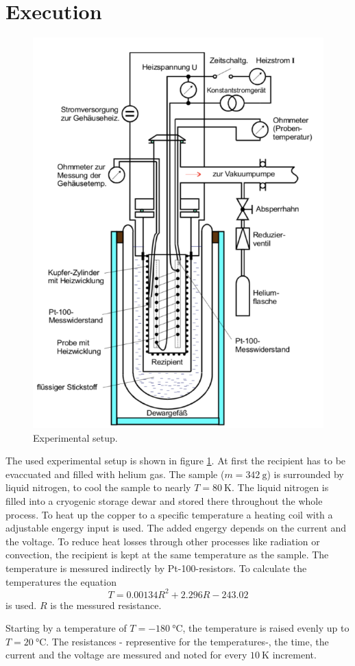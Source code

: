 \section{Execution}
\label{sec:Durchführung}

\begin{figure}
    \centering 
    \includegraphics[width=.8\textwidth]{bilder/Aufbau.PNG}
    \caption{Experimental setup. \cite{V47}}
    \label{fig:Aufbau}
\end{figure}


The used experimental setup is shown in figure \ref{fig:Aufbau}.
At first the recipient has to be evaccuated and filled with helium gas.
The sample ($m=\SI{342}{\g}$) is surrounded by liquid nitrogen, 
to cool the sample to nearly $T=\SI{80}{\kelvin}$. 
The liquid nitrogen is filled into a cryogenic storage dewar 
and stored there throughout the whole process.
To heat up the copper to a specific temperature
a heating coil with a adjustable engergy input is used.
The added engergy depends on the current and the voltage.
To reduce heat losses through other processes like radiation or convection, 
the recipient is kept at the same temperature as the sample.
The temperature is messured indirectly by Pt-100-resistors.
To calculate the temperatures the equation
\begin{equation}
    \label{eq:T}
    T = 0.00134 R^2 + 2.296 R - 243.02
\end{equation}
is used.
$R$ is the messured resistance.




Starting by a temperature of $T=\SI{-180}{\celsius}$, the temperature is raised evenly up to $T=\SI{20}{\celsius}$. 
The resistances - representive for the temperatures-, the time, the current and the voltage are messured 
and noted for every $\SI{10}{\kelvin}$ increment.
